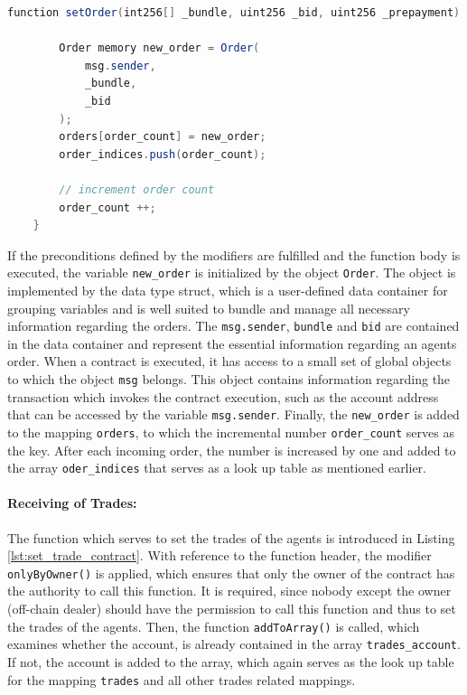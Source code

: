 \begin{lstlisting}[float=htbp, label=lst:set_order_contract, caption=Receiving of Orders from Agents, language=Java]
    function setOrder(int256[] _bundle, uint256 _bid, uint256 _prepayment) public payable checkPrepayment(_prepayment) {

        Order memory new_order = Order(
            msg.sender,
            _bundle,
            _bid
        );
        orders[order_count] = new_order;
        order_indices.push(order_count);

        // increment order count
        order_count ++;
    }
\end{lstlisting}

If the preconditions defined by the modifiers are fulfilled and the function body is executed, 
the variable \verb|new_order| is initialized by the object \verb|Order|. The object is implemented by the data type
struct, which is a user-defined data container for grouping variables and is well suited to bundle and 
manage all necessary information regarding the orders. The \verb|msg.sender|, \verb|bundle| and \verb|bid|
are contained in the data container and represent the essential information regarding an agents order.
When a contract is executed, it has access to a small set of global objects to which the object \verb|msg| belongs.
This object contains information regarding the transaction which invokes the contract execution,
such as the account address that can be accessed by the variable \verb|msg.sender|.
Finally, the \verb|new_order| is added to the mapping \verb|orders|, to which 
the incremental number \verb|order_count| serves as the key.
After each incoming order, the number is increased by one and added to the array \verb|oder_indices|
that serves as a look up table as mentioned earlier.

\paragraph{Receiving of Trades:} The function which serves to set the trades of the agents is introduced in Listing \ref{lst:set_trade_contract}.
With reference to the function header, the modifier \verb|onlyByOwner()| is applied, which ensures that
only the owner of the contract has the authority to call this function.
It is required, since nobody except the owner (off-chain dealer) should have 
the permission to call this function and thus to set the trades of the agents.
Then, the function \verb|addToArray()| is called, which examines whether the account, 
is already contained in the array \verb|trades_account|.
If not, the account is added to the array, which again serves as the look up table for the
mapping \verb|trades| and all other trades related mappings. 

